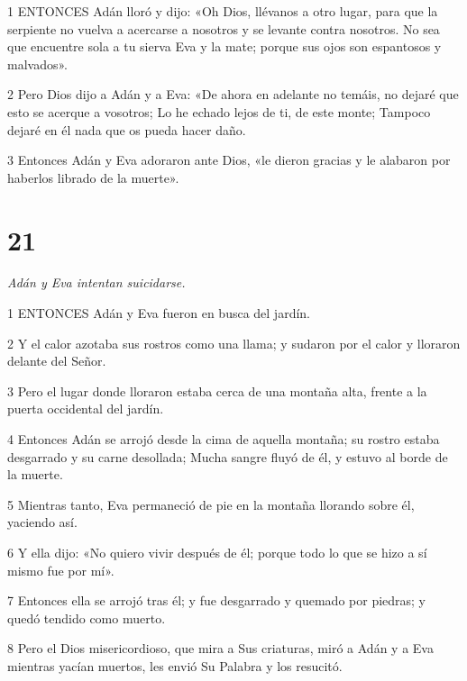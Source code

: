 \par 1 ENTONCES Adán lloró y dijo: «Oh Dios, llévanos a otro lugar, para que la serpiente no vuelva a acercarse a nosotros y se levante contra nosotros. No sea que encuentre sola a tu sierva Eva y la mate; porque sus ojos son espantosos y malvados».

\par 2 Pero Dios dijo a Adán y a Eva: «De ahora en adelante no temáis, no dejaré que esto se acerque a vosotros; Lo he echado lejos de ti, de este monte; Tampoco dejaré en él nada que os pueda hacer daño.

\par 3 Entonces Adán y Eva adoraron ante Dios, «le dieron gracias y le alabaron por haberlos librado de la muerte».

\chapter{21}

\par \textit{Adán y Eva intentan suicidarse.}

\par 1 ENTONCES Adán y Eva fueron en busca del jardín.

\par 2 Y el calor azotaba sus rostros como una llama; y sudaron por el calor y lloraron delante del Señor.

\par 3 Pero el lugar donde lloraron estaba cerca de una montaña alta, frente a la puerta occidental del jardín.

\par 4 Entonces Adán se arrojó desde la cima de aquella montaña; su rostro estaba desgarrado y su carne desollada; Mucha sangre fluyó de él, y estuvo al borde de la muerte.

\par 5 Mientras tanto, Eva permaneció de pie en la montaña llorando sobre él, yaciendo así.

\par 6 Y ella dijo: «No quiero vivir después de él; porque todo lo que se hizo a sí mismo fue por mí».

\par 7 Entonces ella se arrojó tras él; y fue desgarrado y quemado por piedras; y quedó tendido como muerto.

\par 8 Pero el Dios misericordioso, que mira a Sus criaturas, miró a Adán y a Eva mientras yacían muertos, les envió Su Palabra y los resucitó.

